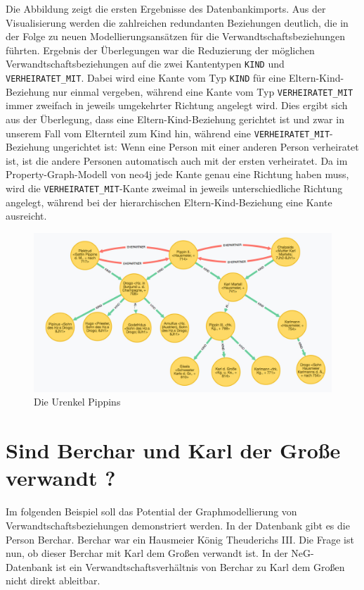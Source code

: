\documentclass[ngerman,]{scrreprt}
\begin{document}
Die Abbildung zeigt die ersten Ergebnisse des Datenbankimports. Aus der Visualisierung werden die zahlreichen redundanten Beziehungen deutlich, die in der Folge zu neuen Modellierungsansätzen für die Verwandtschaftsbeziehungen führten. Ergebnis der Überlegungen war die Reduzierung der möglichen Verwandtschaftsbeziehungen auf die zwei Kantentypen \texttt{KIND} und \texttt{VERHEIRATET\_MIT}. Dabei wird eine Kante vom Typ \texttt{KIND} für eine Eltern-Kind-Beziehung nur einmal vergeben, während eine Kante vom Typ \texttt{VERHEIRATET\_MIT} immer zweifach in jeweils umgekehrter Richtung angelegt wird. Dies ergibt sich aus der Überlegung, dass eine Eltern-Kind-Beziehung gerichtet ist und zwar in unserem Fall vom Elternteil zum Kind hin, während eine \texttt{VERHEIRATET\_MIT}-Beziehung ungerichtet ist: Wenn eine Person mit einer anderen Person verheiratet ist, ist die andere Personen automatisch auch mit der ersten verheiratet. Da im Property-Graph-Modell von neo4j jede Kante genau eine Richtung haben muss, wird die \texttt{VERHEIRATET\_MIT}-Kante zweimal in jeweils unterschiedliche Richtung angelegt, während bei der hierarchischen Eltern-Kind-Beziehung eine Kante ausreicht.

\begin{figure}
\centering
\includegraphics{Bilder/NeG/030-Urenkel-Pippins.jpg}
\caption{Die Urenkel Pippins}
\end{figure}

\section{Sind Berchar und Karl der Große verwandt ?}\label{sind-berchar-und-karl-der-grouxdfe-verwandt}

Im folgenden Beispiel soll das Potential der Graphmodellierung von Verwandtschaftsbeziehungen demonstriert werden. In der Datenbank gibt es die Person Berchar. Berchar war ein Hausmeier König Theuderichs III. Die Frage ist nun, ob dieser Berchar mit Karl dem Großen verwandt ist. In der NeG-Datenbank ist ein Verwandtschaftsverhältnis von Berchar zu Karl dem Großen nicht direkt ableitbar.
\end{document}

